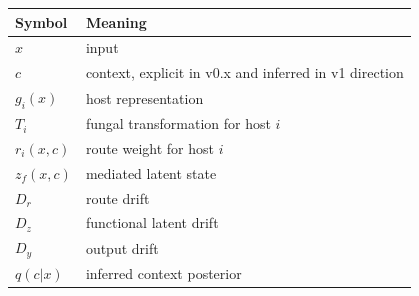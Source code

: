 \documentclass[11pt]{article}
\begin{document}
\begin{tabular}{ll}
\toprule
Symbol & Meaning \\
\midrule
$x$ & input \\
$c$ & context, explicit in v0.x and inferred in v1 direction \\
$g_i(x)$ & host representation \\
$T_i$ & fungal transformation for host $i$ \\
$r_i(x,c)$ & route weight for host $i$ \\
$z_f(x,c)$ & mediated latent state \\
$D_r$ & route drift \\
$D_z$ & functional latent drift \\
$D_y$ & output drift \\
$q(c|x)$ & inferred context posterior \\
\bottomrule
\end{tabular}
\end{document}
